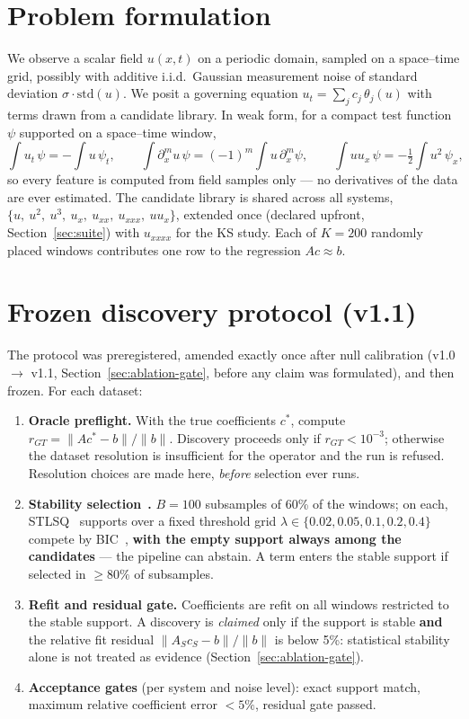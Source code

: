 \documentclass[11pt]{article}
\begin{document}
\section{Problem formulation}
We observe a scalar field $u(x,t)$ on a periodic domain, sampled on a
space--time grid, possibly with additive i.i.d.\ Gaussian measurement noise
of standard deviation $\sigma \cdot \mathrm{std}(u)$. We posit a governing
equation $u_t = \sum_j c_j\, \theta_j(u)$ with terms drawn from a candidate
library. In weak form, for a compact test function $\psi$ supported on a
space--time window,
\begin{equation*}
\int u_t\,\psi = -\int u\,\psi_t, \qquad
\int \partial_x^m u\,\psi = (-1)^m \int u\,\partial_x^m\psi, \qquad
\int u u_x\,\psi = -\tfrac12\int u^2\,\psi_x,
\end{equation*}
so every feature is computed from field samples only --- no derivatives of
the data are ever estimated. The candidate library is shared across all
systems, $\{u,\ u^2,\ u^3,\ u_x,\ u_{xx},\ u_{xxx},\ u u_x\}$, extended once
(declared upfront, Section~\ref{sec:suite}) with $u_{xxxx}$ for the KS
study. Each of $K = 200$ randomly placed windows contributes one row to the
regression $A c \approx b$.

\section{Frozen discovery protocol (v1.1)}
The protocol was preregistered, amended exactly once after null calibration
(v1.0 $\to$ v1.1, Section~\ref{sec:ablation-gate}, before any claim was
formulated), and then frozen. For each dataset:
\begin{enumerate}
\item \textbf{Oracle preflight.} With the true coefficients $c^*$, compute
$r_{GT} = \|A c^* - b\| / \|b\|$. Discovery proceeds only if
$r_{GT} < 10^{-3}$; otherwise the dataset resolution is insufficient for the
operator and the run is refused. Resolution choices are made here,
\emph{before} selection ever runs.
\item \textbf{Stability selection}~\cite{meinshausen2010}\textbf{.} $B = 100$ subsamples of 60\% of the
windows; on each, STLSQ~\cite{brunton2016,zheng2019} supports over a fixed threshold grid
$\lambda \in \{0.02, 0.05, 0.1, 0.2, 0.4\}$ compete by BIC~\cite{schwarz1978}, \textbf{with the
empty support always among the candidates} --- the pipeline can abstain. A
term enters the stable support if selected in $\geq 80\%$ of subsamples.
\item \textbf{Refit and residual gate.} Coefficients are refit on all
windows restricted to the stable support. A discovery is \emph{claimed} only
if the support is stable \textbf{and} the relative fit residual
$\|A_S c_S - b\|/\|b\|$ is below 5\%: statistical stability alone is not
treated as evidence (Section~\ref{sec:ablation-gate}).
\item \textbf{Acceptance gates} (per system and noise level): exact support
match, maximum relative coefficient error $< 5\%$, residual gate passed.
\end{enumerate}
\end{document}
